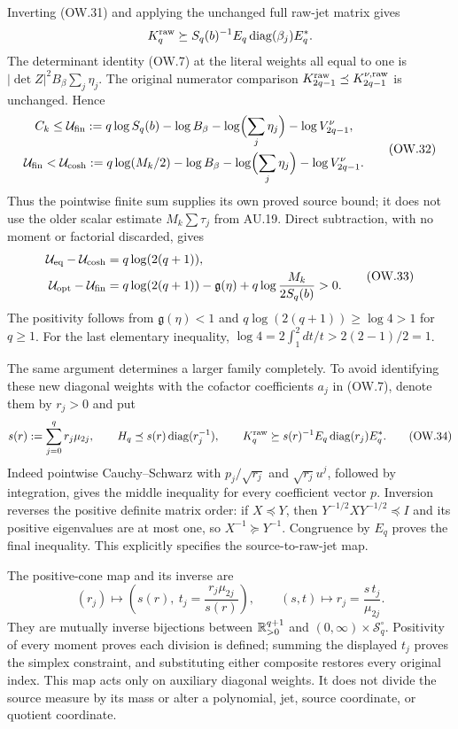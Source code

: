 Inverting (OW.31) and applying the unchanged full raw-jet matrix gives
\[
 K_q^{\rm raw}\succeq S_q(b)^{-1}E_q\operatorname{diag}(\beta_j)E_q^*.
\]
The determinant identity (OW.7) at the literal weights all equal to one
is $|\det Z|^2B_\beta\sum_j\eta_j$. The original numerator comparison
$K_{2q-1}^{\rm raw}\preceq K_{2q-1}^{\nu,\rm raw}$ is unchanged. Hence
\[
 \begin{gathered}
 C_k\le\mathcal U_{\rm fin}:=
 q\log S_q(b)-\log B_\beta-\log\Bigl(\sum_j\eta_j\Bigr)
                       -\log V_{2q-1}^\nu,\\
 \mathcal U_{\rm fin}<\mathcal U_{\rm cosh}:=
 q\log(M_k/2)-\log B_\beta-\log\Bigl(\sum_j\eta_j\Bigr)
                       -\log V_{2q-1}^\nu.
 \end{gathered}                                                \tag{OW.32}
\]
Thus the pointwise finite sum supplies its own proved source bound; it
does not use the older scalar estimate $M_k\sum\tau_j$ from AU.19.
Direct subtraction, with no moment or factorial discarded, gives
\[
 \begin{split}
 \mathcal U_{\rm eq}-\mathcal U_{\rm cosh}
      &=q\log(2(q+1)),\\
 \mathcal U_{\rm opt}-\mathcal U_{\rm fin}
      &=q\log(2(q+1))-\mathfrak g(\eta)
                +q\log\frac{M_k}{2S_q(b)}>0.
 \end{split}                                                  \tag{OW.33}
\]
The positivity follows from $\mathfrak g(\eta)<1$ and
$q\log(2(q+1))\ge\log4>1$ for $q\ge1$.
For the last elementary inequality,
$\log4=2\int_1^2dt/t>2(2-1)/2=1$.

The same argument determines a larger family completely. To avoid
identifying these new diagonal weights with the cofactor coefficients
$a_j$ in (OW.7), denote them by $r_j>0$ and put
\[
 s(r):=\sum_{j=0}^qr_j\mu_{2j},\qquad
 H_q\preceq s(r)\operatorname{diag}(r_j^{-1}),\qquad
 K_q^{\rm raw}\succeq s(r)^{-1}E_q\operatorname{diag}(r_j)E_q^*.
 \tag{OW.34}
\]
Indeed pointwise Cauchy--Schwarz with $p_j/\sqrt{r_j}$ and
$\sqrt{r_j}u^j$, followed by integration, gives the middle inequality
for every coefficient vector $p$. Inversion reverses the positive
definite matrix order: if $X\preceq Y$, then
$Y^{-1/2}XY^{-1/2}\preceq I$ and its positive eigenvalues are at most
one, so $X^{-1}\succeq Y^{-1}$. Congruence by $E_q$ proves the final
inequality. This explicitly specifies the source-to-raw-jet map.

The positive-cone map and its inverse are
\[
 (r_j)\longmapsto\left(s(r),\ t_j=\frac{r_j\mu_{2j}}{s(r)}\right),
 \qquad (s,t)\longmapsto r_j=\frac{s\,t_j}{\mu_{2j}}.
 \tag{OW.35}
\]
They are mutually inverse bijections between $\mathbb R_{>0}^{q+1}$ and
$(0,\infty)\times\mathcal S_q^\circ$. Positivity of every moment
proves each division is defined; summing the displayed $t_j$ proves
the simplex constraint, and substituting either composite restores
every original index. This map acts only on auxiliary diagonal weights.
It does not divide the source measure by its mass or alter a polynomial,
jet, source coordinate, or quotient coordinate.

